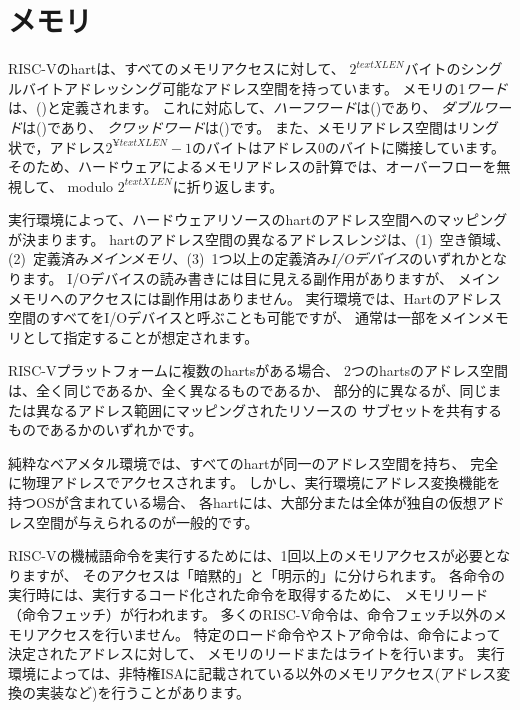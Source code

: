 \section{メモリ}

RISC-Vのhartは、すべてのメモリアクセスに対して、
$2^{text{XLEN}}$バイトのシングルバイトアドレッシング可能なアドレス空間を持っています。 
メモリの1{\em ワード}は、()と定義されます。
これに対応して、{\em ハーフワード}は()であり、
{\em ダブルワード}は()であり、
{\em クワッドワード}は()です。
また、メモリアドレス空間はリング状で，アドレス$2^{¥text{XLEN}}-1$のバイトはアドレス0のバイトに隣接しています。
そのため、ハードウェアによるメモリアドレスの計算では、オーバーフローを無視して、
modulo $2^{text{XLEN}}$に折り返します。

実行環境によって、ハードウェアリソースのhartのアドレス空間へのマッピングが決まります。
hartのアドレス空間の異なるアドレスレンジは、(1)~空き領域、(2)~定義済み{\em メインメモリ}、(3)~1つ以上の定義済み{\em I/Oデバイス}のいずれかとなります。
I/Oデバイスの読み書きには目に見える副作用がありますが、
メインメモリへのアクセスには副作用はありません。
実行環境では、Hartのアドレス空間のすべてをI/Oデバイスと呼ぶことも可能ですが、
通常は一部をメインメモリとして指定することが想定されます。

RISC-Vプラットフォームに複数のhartsがある場合、
2つのhartsのアドレス空間は、全く同じであるか、全く異なるものであるか、
部分的に異なるが、同じまたは異なるアドレス範囲にマッピングされたリソースの
サブセットを共有するものであるかのいずれかです。

\begin{commentary}
純粋なベアメタル環境では、すべてのhartが同一のアドレス空間を持ち、
完全に物理アドレスでアクセスされます。
しかし、実行環境にアドレス変換機能を持つOSが含まれている場合、
各hartには、大部分または全体が独自の仮想アドレス空間が与えられるのが一般的です。
\end{commentary}

RISC-Vの機械語命令を実行するためには、1回以上のメモリアクセスが必要となりますが、
そのアクセスは「暗黙的」と「明示的」に分けられます。
各命令の実行時には、実行するコード化された命令を取得するために、
メモリリード（命令フェッチ）が行われます。
多くのRISC-V命令は、命令フェッチ以外のメモリアクセスを行いません。
特定のロード命令やストア命令は、命令によって決定されたアドレスに対して、
メモリのリードまたはライトを行います。
実行環境によっては、非特権ISAに記載されている以外のメモリアクセス(アドレス変換の実装など)を行うことがあります。

